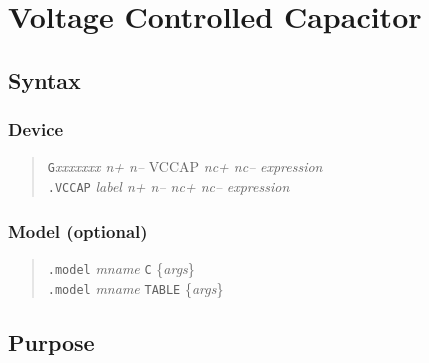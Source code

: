 %
%
%
%
\section{Voltage Controlled Capacitor}
\subsection{Syntax}
\subsubsection{Device}
\begin{verse}
{\tt G}{\it xxxxxxx n+ n--} VCCAP {\it nc+ nc--} {\it expression}\\
{\tt .VCCAP} {\it label n+ n-- nc+ nc--} {\it expression}
\end{verse}
\subsubsection{Model (optional)}
\begin{verse}
{\tt .model} {\it mname} {\tt C} \{{\it args}\} \\
{\tt .model} {\it mname} {\tt TABLE} \{{\it args}\}
\end{verse}
\subsection{Purpose}

